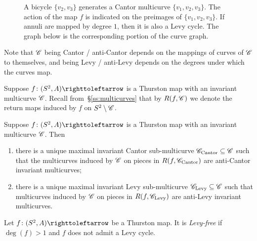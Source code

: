 \documentclass{amsart}
\begin{document}
\begin{figure}
  \caption{A bicycle $\{v_2,v_3\}$ generates a Cantor multicurve
    $\{v_1,v_2,v_3\}$. The action of the map $f$ is indicated on the
    preimages of $\{v_1,v_2,v_3\}$. If annuli are mapped by degree
    $1$, then it is also a Levy cycle. The graph below is the
    corresponding portion of the curve
    graph.} \label{Fig:ExampleCantorMult}
\end{figure}

Note that ${\mathscr C}$ being Cantor / anti-Cantor depends on the mappings of
curves of ${\mathscr C}$ to themselves, and being Levy / anti-Levy depends on
the degrees under which the curves map.

Suppose $f\colon(S^2, A)\selfmap$ is a Thurston map with an invariant
multicurve ${\mathscr C}$. Recall from~\S\ref{ss:multicurves} that by
$R(f,{\mathscr C})$ we denote the return maps induced by $f$ on
$S^2\setminus{\mathscr C}$.

\begin{prop}\label{Prop:CantorMultCurv}
  Suppose $f\colon(S^2, A)\selfmap$ is a Thurston map with an
  invariant multicurve ${\mathscr C}$. Then
  \begin{enumerate}
  \item there is a unique maximal invariant Cantor sub-multicurve
    ${\mathscr C}_{\text{Cantor}}\subseteq{\mathscr C}$ such that the multicurves
    induced by ${\mathscr C}$ on pieces in $R(f,{\mathscr C}_{\text{Cantor}})$ are
    anti-Cantor invariant multicurves;
  \item there is a unique maximal invariant Levy sub-multicurve
    ${\mathscr C}_{\text{Levy}}\subseteq{\mathscr C}$ such that multicurves induced by
    ${\mathscr C}$ on pieces in $R(f,{\mathscr C}_{\text{Levy}})$ are anti-Levy
    invariant multicurves.
\end{enumerate}
\end{prop}

\begin{defn}\label{defn:levyfree}
  Let $f\colon(S^2,A)\selfmap$ be a Thurston map. It is
  \textit{Levy-free} if $\deg(f)>1$ and $f$ does not admit a Levy
  cycle.
\end{defn}
\end{document}

